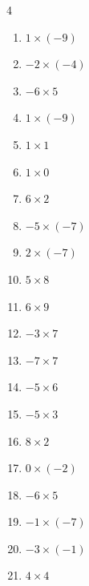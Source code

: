\begin{multicols}{4}
\begin{enumerate}
  \item $1\times (-9)$
        \phantom{$=-9$}

  \item $-2\times (-4)$
        \phantom{$=8$}

  \item $-6\times 5$
        \phantom{$=-30$}

  \item $1\times (-9)$
        \phantom{$=-9$}

  \item $1\times 1$
        \phantom{$=1$}

  \item $1\times 0$
        \phantom{$=0$}

  \item $6\times 2$
        \phantom{$=12$}

  \item $-5\times (-7)$
        \phantom{$=35$}

  \item $2\times (-7)$
        \phantom{$=-14$}

\columnbreak %

  \item $5\times 8$
        \phantom{$=40$}

  \item $6\times 9$
        \phantom{$=54$}

  \item $-3\times 7$
        \phantom{$=-21$}

  \item $-7\times 7$
        \phantom{$=-49$}

  \item $-5\times 6$
        \phantom{$=-30$}

  \item $-5\times 3$
        \phantom{$=-15$}

  \item $8\times 2$
        \phantom{$=16$}

  \item $0\times (-2)$
        \phantom{$=0$}

  \item $-6\times 5$
        \phantom{$=-30$}

  \item $-1\times (-7)$
        \phantom{$=7$}

  \item $-3\times (-1)$
        \phantom{$=3$}

  \item $4\times 4$
        \phantom{$=16$}


\end{enumerate}
\end{multicols}
